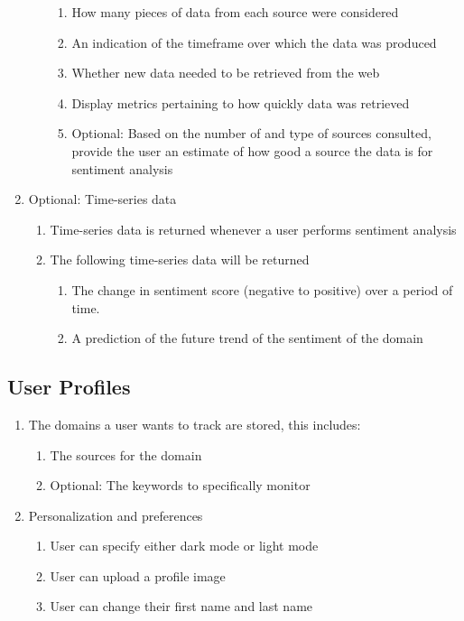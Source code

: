 \documentclass[12pt]{article}
\begin{document}
\begin{enumerate}
\begin{enumerate}
\begin{enumerate}
                  \item How many pieces of data from each source were considered
                  \item An indication of the timeframe over which the data was produced
                  \item Whether new data needed to be retrieved from the web
                  \item Display metrics pertaining to how quickly data was retrieved
                  \item Optional: Based on the number of and type of sources consulted, provide the user an estimate of how good a source the data is for sentiment analysis
                \end{enumerate}
        \end{enumerate}
  \item Optional: Time-series data
        \begin{enumerate}
          \item Time-series data is returned whenever a user performs sentiment analysis
          \item The following time-series data will be returned
                \begin{enumerate}
                  \item The change in sentiment score (negative to positive) over a period of time.
                  \item A prediction of the future trend of the sentiment of the domain
                \end{enumerate}
        \end{enumerate}
\end{enumerate}

\subsection{User Profiles}
\begin{enumerate}
  \item The domains a user wants to track are stored, this includes:
        \begin{enumerate}
          \item The sources for the domain
          \item Optional: The keywords to specifically monitor
        \end{enumerate}
  \item Personalization and preferences
        \begin{enumerate}
          \item User can specify either dark mode or light mode
          \item User can upload a profile image
          \item User can change their first name and last name
        \end{enumerate}
\end{enumerate}
\end{document}
